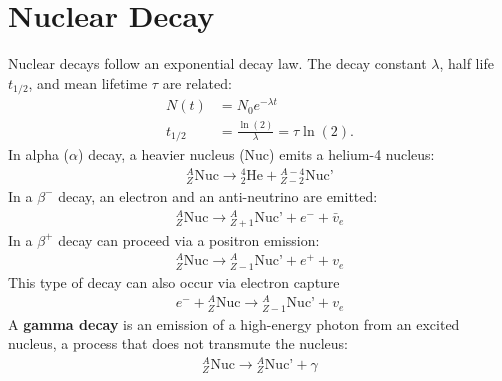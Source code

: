 \section{Nuclear Decay}
\begin{multicols}{2}
Nuclear decays follow an exponential decay law. The decay constant $\lambda$, half life $t_{1/2}$, and mean lifetime $\tau$ are related:
\begin{align}
N(t)&=N_0e^{-\lambda t}\\
t_{1/2}&=\frac{\ln(2)}{\lambda}=\tau \ln(2).
\end{align}
In alpha ($\alpha$) decay, a heavier nucleus (Nuc) emits a helium-4 nucleus:
\begin{align}
{}^A_Z\textrm{Nuc} \to {}^{4}_{2}\textrm{He} + {}^{A-4}_{Z-2}\textrm{Nuc'}
\end{align}
In a $\beta^-$ decay, an electron and an anti-neutrino are emitted:
\begin{align}
{}^A_Z\textrm{Nuc} \to {}^{A}_{Z+1}\textrm{Nuc'} + e^- +\bar{v}_e
\end{align}
In a $\beta^+$ decay can proceed via a positron emission:
\begin{align}
{}^A_Z\textrm{Nuc} \to {}^{A}_{Z-1}\textrm{Nuc'} + e^+ +v_e
\end{align}
This type of decay can also occur via electron capture
\begin{align}
e^-+{}^A_Z\textrm{Nuc} \to {}^{A}_{Z-1}\textrm{Nuc'} +v_e
\end{align}
A \textbf{gamma decay} is an emission of a high-energy photon from an excited nucleus, a process that does not transmute the nucleus:
\begin{align}
{}^A_Z\textrm{Nuc} \to {}^{A}_{Z}\textrm{Nuc'} +\gamma
\end{align}
\end{multicols}



